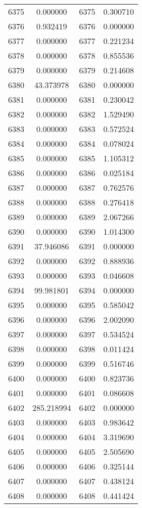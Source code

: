 \documentclass[12pt]{article}
\begin{document}
\begin{longtable}{@{}cccc@{}}
6375 & 0.000000 & 6375 & 0.300710 \\
6376 & 0.932419 & 6376 & 0.000000 \\
6377 & 0.000000 & 6377 & 0.221234 \\
6378 & 0.000000 & 6378 & 0.855536 \\
6379 & 0.000000 & 6379 & 0.214608 \\
6380 & 43.373978 & 6380 & 0.000000 \\
6381 & 0.000000 & 6381 & 0.230042 \\
6382 & 0.000000 & 6382 & 1.529490 \\
6383 & 0.000000 & 6383 & 0.572524 \\
6384 & 0.000000 & 6384 & 0.078024 \\
6385 & 0.000000 & 6385 & 1.105312 \\
6386 & 0.000000 & 6386 & 0.025184 \\
6387 & 0.000000 & 6387 & 0.762576 \\
6388 & 0.000000 & 6388 & 0.276418 \\
6389 & 0.000000 & 6389 & 2.067266 \\
6390 & 0.000000 & 6390 & 1.014300 \\
6391 & 37.946086 & 6391 & 0.000000 \\
6392 & 0.000000 & 6392 & 0.888936 \\
6393 & 0.000000 & 6393 & 0.046608 \\
6394 & 99.981801 & 6394 & 0.000000 \\
6395 & 0.000000 & 6395 & 0.585042 \\
6396 & 0.000000 & 6396 & 2.002090 \\
6397 & 0.000000 & 6397 & 0.534524 \\
6398 & 0.000000 & 6398 & 0.011424 \\
6399 & 0.000000 & 6399 & 0.516746 \\
6400 & 0.000000 & 6400 & 0.823736 \\
6401 & 0.000000 & 6401 & 0.086608 \\
6402 & 285.218994 & 6402 & 0.000000 \\
6403 & 0.000000 & 6403 & 0.983642 \\
6404 & 0.000000 & 6404 & 3.319690 \\
6405 & 0.000000 & 6405 & 2.505690 \\
6406 & 0.000000 & 6406 & 0.325144 \\
6407 & 0.000000 & 6407 & 0.438124 \\
6408 & 0.000000 & 6408 & 0.441424 \\

\end{longtable}
\end{document}
